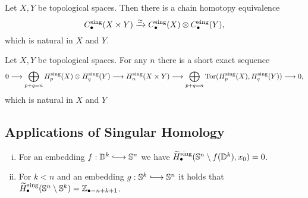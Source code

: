 
	\begin{theorem}
		Let $X,Y$ be topological spaces. Then there is a chain homotopy equivalence
		\begin{equation*}
			C_\bullet^\text{sing}(X \times Y) \xrightarrow{\simeq} C_\bullet^\text{sing}(X) \otimes C_\bullet^\text{sing}(Y),
		\end{equation*}
		which is natural in $X$ and $Y$.
	\end{theorem}

	\begin{corollary}
		Let $X,Y$ be topological spaces. For any $n$ there is a short exact sequence
		\begin{align*}
			0 --> \bigoplus \limits_{p+q=n}H_p^\text{sing}(X) \otimes H_q^\text{sing}(Y) --> H_n^\text{sing}(X \times Y) --> \bigoplus \limits_{p+q=n} \operatorname{Tor}(H_p^\text{sing}(X),H_q^\text{sing}(Y)) --> 0,
		\end{align*}
		which is natural in $X$ and $Y$ 
	\end{corollary}

	\newpage
	\subsection{Applications of Singular Homology}

	\begin{proposition}
		\vspace{-1.5em}
		\begin{enumerate}[(i)]
			\item{
				For an embedding $f:\D^k \longrightincl \S^n$ we have $\widetilde{H}_\bullet^\text{sing}(\mathbb{S}^n \setminus f(\mathbb{D}^k),x_0) = 0$.
			}
			\item{
				For $k<n$ and an embedding $g: \S^k \longrightincl \S^n$ it holds that $\widetilde{H}_\bullet^\text{sing}(\mathbb{S}^n \setminus \mathbb{S}^k) = \mathbb{Z}_{\bullet-n+k+1}$.
			}
		\end{enumerate}
	\end{proposition}

